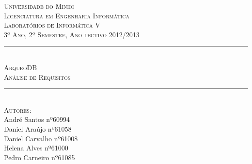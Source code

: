 ﻿\documentclass[12pt,a4paper]{article}
\begin{document}
\begin{titlepage}
\onehalfspacing

\newcommand{\HRule}{\rule{\linewidth}{0.5mm}} %

\center %
 

\textsc{\LARGE Universidade do Minho}\\[1.5cm] %
\textsc{\Large Licenciatura em Engenharia Informática}\\[0.5cm] %
\textsc{\large Laboratórios de Informática V}\\[0.5cm] %
\textsc{3º Ano, 2º Semestre, Ano lectivo 2012/2013}\\[0.5cm]


\HRule \\[0.4cm]
\textsc{\Large ArqueoDB}\\[0.4cm] %
\textsc{ \large Análise de Requisitos}\\[0.4cm] %
\HRule \\[1.5cm]
 

\textsc{\large Autores:}\\
{André Santos nº60994 \\ Daniel Araújo nº61058 \\ Daniel Carvalho nº61008\\ Helena Alves nº61000 \\ Pedro Carneiro nº61085}\\[1cm] %



\end{titlepage}
\end{document}
